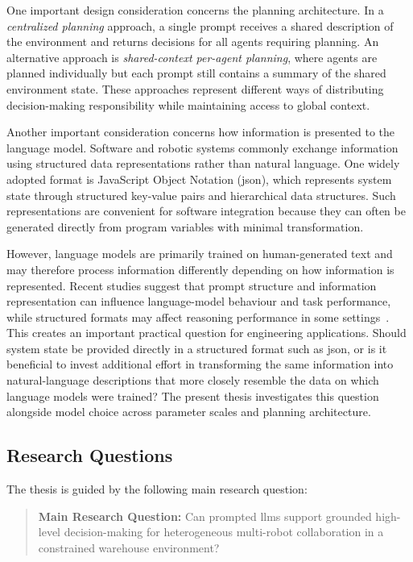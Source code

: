 One important design consideration concerns the planning architecture. In a \emph{centralized planning} approach, a single prompt receives a shared description of the environment and returns decisions for all agents requiring planning. An alternative approach is \emph{shared-context per-agent planning}, where agents are planned individually but each prompt still contains a summary of the shared environment state. These approaches represent different ways of distributing decision-making responsibility while maintaining access to global context.

Another important consideration concerns how information is presented to the language model. Software and robotic systems commonly exchange information using structured data representations rather than natural language. One widely adopted format is JavaScript Object Notation (\gls{json}), which represents system state through structured key-value pairs and hierarchical data structures. Such representations are convenient for software integration because they can often be generated directly from program variables with minimal transformation.

However, language models are primarily trained on human-generated text and may therefore process information differently depending on how information is represented. Recent studies suggest that prompt structure and information representation can influence language-model behaviour and task performance, while structured formats may affect reasoning performance in some settings~\cite{sahoo2024promptsurvey,tam2024letmespeak}. This creates an important practical question for engineering applications. Should system state be provided directly in a structured format such as \gls{json}, or is it beneficial to invest additional effort in transforming the same information into natural-language descriptions that more closely resemble the data on which language models were trained? The present thesis investigates this question alongside model choice across parameter scales and planning architecture.
\subsection{Research Questions}
\label{sec:rq}
The thesis is guided by the following main research question:

\begin{quote}
\textbf{Main Research Question:} Can prompted \glspl{llm} support grounded high-level decision-making for heterogeneous multi-robot collaboration in a constrained warehouse environment?
\end{quote}

